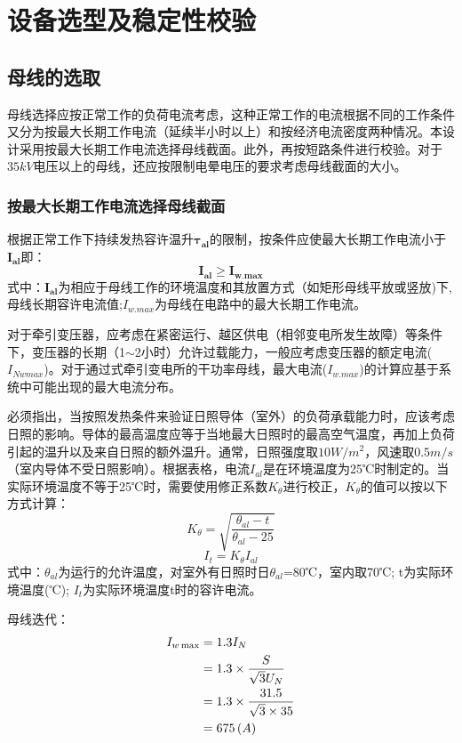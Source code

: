 \chapter{设备选型及稳定性校验}

\section{母线的选取}
母线选择应按正常工作的负荷电流考虑，这种正常工作的电流根据不同的工作条件又分为按最大长期工作电流（延续半小时以上）和按经济电流密度两种情况。本设计采用按最大长期工作电流选择母线截面。此外，再按短路条件进行校验。对于$35kV$电压以上的母线，还应按限制电晕电压的要求考虑母线截面的大小。
\subsection{按最大长期工作电流选择母线截面}
根据正常工作下持续发热容许温升$\boldsymbol{\tau }_{\boldsymbol{al}}$的限制，按条件应使最大长期工作电流小于$\boldsymbol{I}_{\boldsymbol{al}}$即：
$$
\boldsymbol{I}_{\boldsymbol{al}}\ge \boldsymbol{I}_{\boldsymbol{w}.\boldsymbol{max}}\label{key}
$$
式中：$\boldsymbol{I}_{\boldsymbol{al}}$为相应于母线工作的环境温度和其放置方式（如矩形母线平放或竖放)下,母线长期容许电流值;$I_{w.max}$为母线在电路中的最大长期工作电流。

对于牵引变压器，应考虑在紧密运行、越区供电（相邻变电所发生故障）等条件下，变压器的长期（1$\sim$2小时）允许过载能力，一般应考虑变压器的额定电流($I_{Nwmax}$)。对于通过式牵引变电所的干功率母线，最大电流($I_{w.max}$)的计算应基于系统中可能出现的最大电流分布。

必须指出，当按照发热条件来验证日照导体（室外）的负荷承载能力时，应该考虑日照的影响。导体的最高温度应等于当地最大日照时的最高空气温度，再加上负荷引起的温升以及来自日照的额外温升。通常，日照强度取$10{W/m^2}$，风速取$0.5 m/s$（室内导体不受日照影响）。根据表格，电流$I_{al}$是在环境温度为25℃时制定的。当实际环境温度不等于25℃时，需要使用修正系数$K_\theta$进行校正，$K_\theta$的值可以按以下方式计算：
$$
K_{\theta}=\sqrt{\frac{\theta _{al}-t}{\theta _{al}-25}}
$$
$$
I_t=K_{\theta}I_{al}
$$
式中：$\theta_{al}$为运行的允许温度，对室外有日照时日$\theta_{al}$=80℃，室内取70℃; t为实际环境温度(℃); $I_t$为实际环境温度t时的容许电流。

母线迭代：
\begin{align}
	I_{w\max}&=1.3I_N\notag
	\\
	&=1.3\times \frac{S}{\sqrt{3}U_N}\notag
	\\
	&=1.3\times \frac{31.5}{\sqrt{3}\times 35}\notag
	\\
	&=675\left( A \right) 
\end{align}

